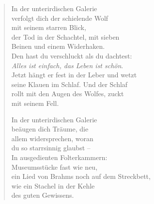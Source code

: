 
\cleartoverso


\begin{verse}

In der unterirdischen Galerie\\
verfolgt dich der schielende Wolf\\
mit seinem starren Blick,\\
der Tod in der Schachtel, mit sieben\\
Beinen und einem Widerhaken.\\
Den hast du verschluckt als du dachtest:\\
\emph{Alles ist einfach, das Leben ist schön}.\\
Jetzt hängt er fest in der Leber und wetzt\\
seine Klauen im Schlaf. Und der Schlaf\\
rollt mit den Augen des Wolfes, zuckt\\
mit seinem Fell.

In der unterirdischen Galerie\\
beäugen dich Träume, die\\
allem widersprechen, woran\\
du so starrsinnig glaubst --\\
In ausgedienten Folterkammern:\\
Museumsstücke fast wie neu,\\
ein Lied von Brahms noch auf dem Streckbett,\\
wie ein Stachel in der Kehle\\
des guten Gewissens.
\end{verse}

\clearpage


